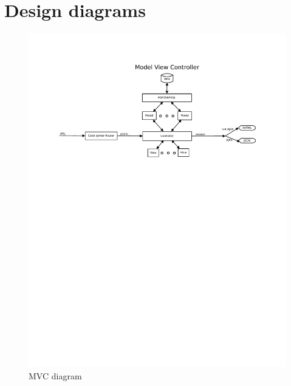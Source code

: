 \chapter{Design diagrams}
\label{app:diagrams}




\begin{figure}
\centering
\includegraphics[scale=0.93,angle=90]{mvc.pdf}
\caption{MVC diagram}
\end{figure}

